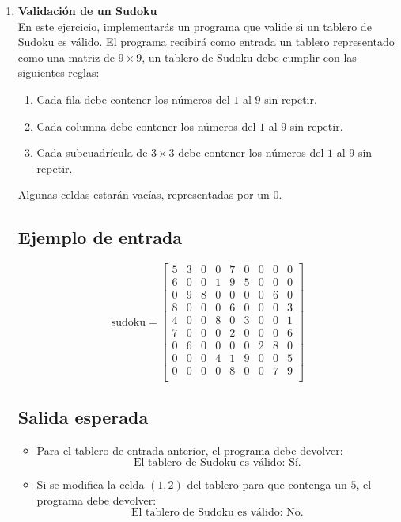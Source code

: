 \begin{enumerate}
    \item \textbf{Validación de un Sudoku}\\
    En este ejercicio, implementarás un programa que valide si un tablero de Sudoku es válido. El programa recibirá como entrada un tablero representado como una matriz de \(9 \times 9\), un tablero de Sudoku debe cumplir con las siguientes reglas:
    \begin{enumerate}
        \item Cada fila debe contener los números del \(1\) al \(9\) sin repetir.
        \item Cada columna debe contener los números del \(1\) al \(9\) sin repetir.
        \item Cada subcuadrícula de \(3 \times 3\) debe contener los números del \(1\) al \(9\) sin repetir.
    \end{enumerate}

    Algunas celdas estarán vacías, representadas por un \(0\).

    \subsection*{Ejemplo de entrada}
    \[
    \text{sudoku} = 
    \begin{bmatrix}
    5 & 3 & 0 & 0 & 7 & 0 & 0 & 0 & 0 \\
    6 & 0 & 0 & 1 & 9 & 5 & 0 & 0 & 0 \\
    0 & 9 & 8 & 0 & 0 & 0 & 0 & 6 & 0 \\
    8 & 0 & 0 & 0 & 6 & 0 & 0 & 0 & 3 \\
    4 & 0 & 0 & 8 & 0 & 3 & 0 & 0 & 1 \\
    7 & 0 & 0 & 0 & 2 & 0 & 0 & 0 & 6 \\
    0 & 6 & 0 & 0 & 0 & 0 & 2 & 8 & 0 \\
    0 & 0 & 0 & 4 & 1 & 9 & 0 & 0 & 5 \\
    0 & 0 & 0 & 0 & 8 & 0 & 0 & 7 & 9 \\
    \end{bmatrix}
    \]
    \subsection*{Salida esperada}

    \begin{itemize}
        \item Para el tablero de entrada anterior, el programa debe devolver:
        \[
        \text{El tablero de Sudoku es válido: Sí.}
        \]
        \item Si se modifica la celda \((1,2)\) del tablero para que contenga un \(5\), el programa debe devolver:
        \[
        \text{El tablero de Sudoku es válido: No.}
        \]
    \end{itemize}


\end{enumerate}
